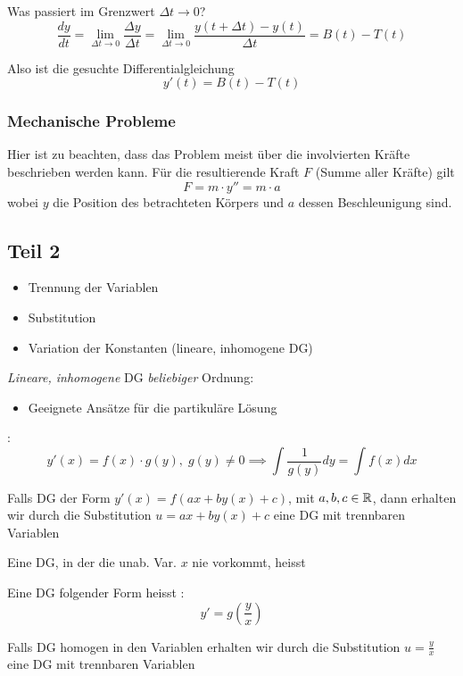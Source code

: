 Was passiert im Grenzwert $\Delta t \to 0$?
$$\frac{dy}{dt} = \lim_{\Delta t \to 0} \frac{\Delta y}{\Delta t} = \lim_{\Delta t \to 0}\frac{y(t + \Delta t) - y(t)}{\Delta t} = B(t) - T(t)$$

Also ist die gesuchte Differentialgleichung
$$y'(t) = B(t) - T(t)$$

\subsubsection{Mechanische Probleme}

Hier ist zu beachten, dass das Problem meist über die involvierten Kräfte beschrieben werden kann.
Für die resultierende Kraft $F$ (Summe aller Kräfte) gilt
$$F = m \cdot y'' = m \cdot a$$
wobei $y$ die Position des betrachteten Körpers und $a$ dessen Beschleunigung sind.

\subsection{Teil 2}

\begin{itemize}
    \item Trennung der Variablen
    \item Substitution
    \item Variation der Konstanten (lineare, inhomogene DG)
\end{itemize}
\textit{Lineare, inhomogene} DG \textit{beliebiger} Ordnung:
\vspace{-0.6em}
\begin{itemize}
    \item Geeignete Ansätze für die partikuläre Lösung
\end{itemize}

\Satz {}:
$$y'(x) = f(x) \cdot g(y), \; g(y) \ne 0 \implies \int \frac{1}{g(y)} dy = \int f(x) dx$$

\Satz {} Falls DG der Form
$y'(x) = f(ax + by(x) + c)$, mit $a, b, c \in \mathbb{R}$, dann erhalten wir durch die
Substitution $u = ax + by(x) + c$ eine DG mit trennbaren Variablen

\Def Eine DG, in der die unab. Var. $x$ nie vorkommt, heisst 

\Def Eine DG folgender Form heisst :
$$y' = g\left(\frac{y}{x}\right)$$

\Satz {} Falls DG homogen in den Variablen
erhalten wir durch die Substitution $u = \frac{y}{x}$ eine DG mit trennbaren Variablen

